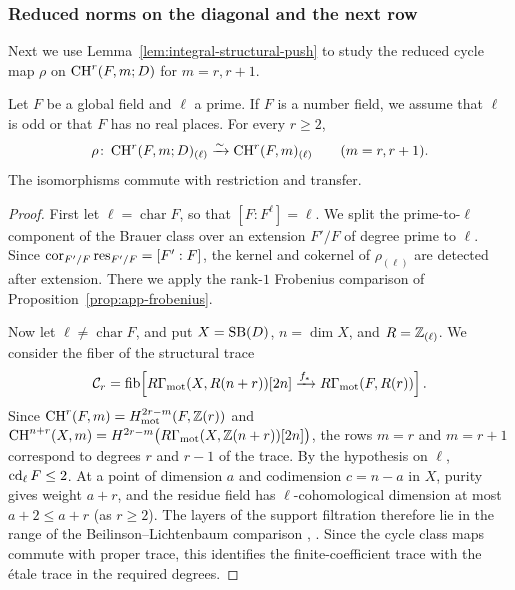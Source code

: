 \subsubsection{Reduced norms on the diagonal and the next row}
Next we use Lemma~\ref{lem:integral-structural-push} to study the reduced cycle map $\rho$ on $\operatorname{CH}^r(F,m;D)$ for $m=r,r+1$.

\begin{proposition}\label{prop:global-two-chow-rows}
Let $F$ be a global field and $\ell$ a prime.
If $F$ is a number field, we assume that $\ell$ is odd or that $F$ has no real places.
For every $r\ge2$,
\[
 \rho\colon\operatorname{CH}^r(F,m;D)_{(\ell)}
    \xrightarrow{\sim}\operatorname{CH}^r(F,m)_{(\ell)}
    \qquad(m=r,r+1).
\]
The isomorphisms commute with restriction and transfer.
\end{proposition}
\begin{proof}
First let $\ell=\operatorname{char}F$, so that $[F:F^\ell]=\ell$.
We split the prime-to-$\ell$ component of the Brauer class over an extension $F'/F$ of degree prime to $\ell$.
Since $\operatorname{cor}_{F'/F}\operatorname{res}_{F'/F}=[F':F]$, the kernel and cokernel of $\rho_{(\ell)}$ are detected after extension.
There we apply the rank-$1$ Frobenius comparison of Proposition~\ref{prop:app-frobenius}.

Now let $\ell\ne\operatorname{char}F$, and put $X=\operatorname{SB}(D)$, $n=\dim X$, and $R=\mathbb Z_{(\ell)}$.
We consider the fiber of the structural trace
\[
 \mathcal C_r=\operatorname{fib}\!\left[
 R\Gamma_{\mathrm{mot}}(X,R(n+r))[2n]
   \xrightarrow{f_*}R\Gamma_{\mathrm{mot}}(F,R(r))\right].
\]
Since $\operatorname{CH}^r(F,m)=H^{2r-m}_{\mathrm{mot}}(F,\mathbb Z(r))$ and $\operatorname{CH}^{n+r}(X,m)=H^{2r-m}\bigl(R\Gamma_{\mathrm{mot}}(X,\mathbb Z(n+r))[2n]\bigr)$, the rows $m=r$ and $m=r+1$ correspond to degrees $r$ and $r-1$ of the trace.
By the hypothesis on $\ell$, $\operatorname{cd}_\ell F\le2$.
At a point of dimension $a$ and codimension $c=n-a$ in $X$, purity gives weight $a+r$, and the residue field has $\ell$-cohomological dimension at most $a+2\le a+r$ (as $r\ge2$).
The layers of the support filtration therefore lie in the range of the Beilinson--Lichtenbaum comparison \cite{Voevodsky}, \cite[Theorem 2.3(2)]{Yamazaki2013}.
Since the cycle class maps commute with proper trace, this identifies the finite-coefficient trace with the \'etale trace in the required degrees.


\end{proof}
